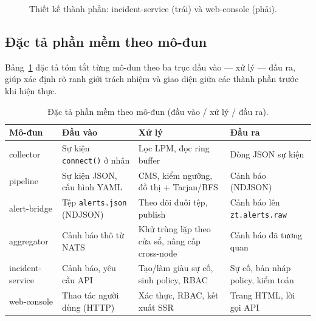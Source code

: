 \begin{figure}[H]
  \centering
  \begin{minipage}{0.48\linewidth}\centering\resizebox{\linewidth}{!}{}\end{minipage}\hfill
  \begin{minipage}{0.48\linewidth}\centering\resizebox{\linewidth}{!}{}\end{minipage}
  \caption{Thiết kế thành phần: incident-service (trái) và web-console (phải).}
  \label{fig:comp-inc-console}
\end{figure}

\subsection{Đặc tả phần mềm theo mô-đun}
\label{subsec:soft-spec}

Bảng~\ref{tab:soft-spec} đặc tả tóm tắt từng mô-đun theo ba trục đầu vào --- xử lý ---
đầu ra, giúp xác định rõ ranh giới trách nhiệm và giao diện giữa các thành phần trước khi
hiện thực.

\begin{table}[H]
  \centering
  \caption{Đặc tả phần mềm theo mô-đun (đầu vào / xử lý / đầu ra).}
  \label{tab:soft-spec}
  \small
  \begin{tabularx}{\linewidth}{@{}l X X X@{}}
    \toprule
    \textbf{Mô-đun} & \textbf{Đầu vào} & \textbf{Xử lý} & \textbf{Đầu ra} \\
    \midrule
    collector       & Sự kiện \texttt{connect()} ở nhân & Lọc LPM, đọc ring buffer & Dòng JSON sự kiện \\
    pipeline        & Sự kiện JSON, cấu hình YAML & CMS, kiểm ngưỡng, đồ thị + Tarjan/BFS & Cảnh báo (NDJSON) \\
    alert-bridge    & Tệp \texttt{alerts.json} (NDJSON) & Theo dõi đuôi tệp, publish & Cảnh báo lên \texttt{zt.alerts.raw} \\
    aggregator      & Cảnh báo thô từ NATS & Khử trùng lặp theo cửa sổ, nâng cấp cross-node & Cảnh báo đã tương quan \\
    incident-service& Cảnh báo, yêu cầu API & Tạo/làm giàu sự cố, sinh policy, RBAC & Sự cố, bản nháp policy, kiểm toán \\
    web-console     & Thao tác người dùng (HTTP) & Xác thực, RBAC, kết xuất SSR & Trang HTML, lời gọi API \\
    \bottomrule
  \end{tabularx}
\end{table}


